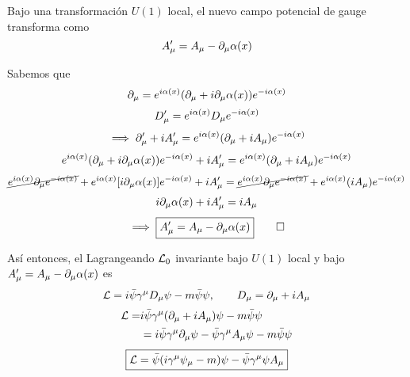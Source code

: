\begin{teor}
	Bajo una transformación $U(1)$ local, el nuevo campo potencial de gauge transforma como
	\begin{equation}
  A_\mu '=A_\mu -\partial_\mu \alpha(x)
\end{equation}
\end{teor}

\begin{prueba}
	Sabemos que
	\begin{equation}
  \partial_\mu =e^{i\alpha(x)}(\partial_\mu +i\partial_\mu \alpha(x))e^{-i\alpha(x)}
\end{equation}
\begin{equation}
  D_\mu '=e^{i\alpha(x)}D_\mu e^{-i\alpha(x)}
\end{equation}
\begin{equation}
  \implies \partial_\mu '+iA_\mu '=e^{i\alpha(x)}(\partial_\mu +iA_\mu )e^{-i\alpha(x)}
\end{equation}
\begin{equation}
  e^{i\alpha(x)}(\partial_\mu +i\partial_\mu \alpha(x))e^{-i\alpha(x)}+iA_\mu '=e^{i\alpha(x)}(\partial_\mu +iA_\mu )e^{-i\alpha(x)}
\end{equation}
\begin{equation}
  \cancel{e^{i\alpha(x)}\partial_\mu e^{-i\alpha(x)}}+e^{i\alpha(x)}[i\partial_\mu \alpha(x)]e^{-i\alpha(x)}+iA_\mu '=\cancel{e^{i\alpha(x)}\partial_\mu e^{-i\alpha(x)}}+e^{i\alpha(x)}(iA_\mu )e^{-i\alpha(x)}
\end{equation}
\begin{equation}
  i\partial_\mu \alpha(x)+iA_\mu '=iA_\mu 
\end{equation}
\begin{equation}
  \implies \boxed{A_\mu '=A_\mu -\partial_\mu \alpha(x)}\qquad \Box 
\end{equation}
\end{prueba}
Así entonces, el Lagrangeando $\mathcal{L}_0$ invariante bajo $U(1)$ local y bajo $A_\mu '=A_\mu -\partial_\mu \alpha(x)$ es
\begin{equation}
  \mathcal{L} =i\bar{\psi}\gamma^\mu D_\mu \psi-m\bar{\psi}\psi,\qquad D_\mu =\partial_\mu +iA_\mu 
\end{equation}
\begin{align}
  \mathcal{L} =&i\bar{\psi}\gamma ^\mu (\partial_\mu +iA_\mu )\psi-m\bar{\psi}\psi\\
  &=i\bar{\psi}\gamma^\mu \partial_\mu \psi-\bar{\psi}\gamma^\mu A_\mu \psi-m\bar{\psi}\psi
\end{align}
\begin{equation}
\boxed{  \mathcal{L} =\bar{\psi}(i\gamma^\mu \psi_\mu -m)\psi-\bar{\psi}\gamma^\mu \psi A_\mu }
\end{equation}
